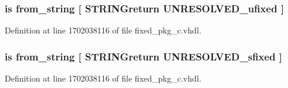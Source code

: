 \subsubsection[{from\+\_\+binary\+\_\+string}]{ {\bfseries \textcolor{keywordflow}{is}\textcolor{vhdlchar}{ }\textcolor{vhdlchar}{from\+\_\+string}\textcolor{vhdlchar}{ }\textcolor{vhdlchar}{\mbox{[}}\textcolor{vhdlchar}{ }\textcolor{vhdlchar}{S\+T\+R\+I\+N\+Greturn}\textcolor{vhdlchar}{ }{\bfseries {\bf U\+N\+R\+E\+S\+O\+L\+V\+E\+D\+\_\+ufixed}} \textcolor{vhdlchar}{ }\textcolor{vhdlchar}{\mbox{]}}\textcolor{vhdlchar}{ }} \hspace{0.3cm}{\ttfamily [Alias]}}\label{classfixed__pkg_a8e105c4593830f93742f43539e13c450}


Definition at line 1702038116 of file fixed\+\_\+pkg\+\_\+c.\+vhdl.

\hypertarget{classfixed__pkg_a8a1b689470218e049c41d22ea4354e26}{}
\subsubsection[{from\+\_\+binary\+\_\+string}]{ {\bfseries \textcolor{keywordflow}{is}\textcolor{vhdlchar}{ }\textcolor{vhdlchar}{from\+\_\+string}\textcolor{vhdlchar}{ }\textcolor{vhdlchar}{\mbox{[}}\textcolor{vhdlchar}{ }\textcolor{vhdlchar}{S\+T\+R\+I\+N\+Greturn}\textcolor{vhdlchar}{ }{\bfseries {\bf U\+N\+R\+E\+S\+O\+L\+V\+E\+D\+\_\+sfixed}} \textcolor{vhdlchar}{ }\textcolor{vhdlchar}{\mbox{]}}\textcolor{vhdlchar}{ }} \hspace{0.3cm}{\ttfamily [Alias]}}\label{classfixed__pkg_a8a1b689470218e049c41d22ea4354e26}


Definition at line 1702038116 of file fixed\+\_\+pkg\+\_\+c.\+vhdl.

\hypertarget{classfixed__pkg_a7eb54bde4b5dd58cbf3cdff96c651c5a}{}
